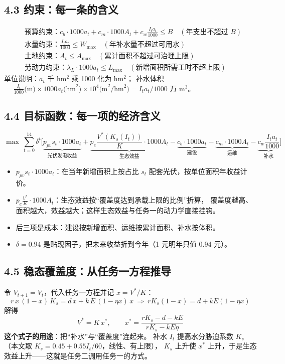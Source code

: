 \documentclass[11pt,a4paper]{ctexart}
\begin{document}
\subsection*{4.3 约束：每一条的含义}
\begin{align}
&\text{预算约束：} c_b\cdot1000a_t+c_m\cdot1000A_t+c_w\frac{I_ta_t}{1000}\le B \quad(\text{年支出不超过 }B)\\
&\text{水量约束：} \frac{I_ta_t}{1000}\le W_{\max} \quad(\text{年补水量不超过可用水})\\
&\text{土地约束：} A_t\le A_{\max} \quad(\text{累计面积不超过可治理上限})\\
&\text{劳动力约束：} \lambda_L\cdot1000a_t\le L_{\max} \quad(\text{新增面积所需工时不超上限})
\end{align}
单位说明：$a_t$ 千 hm$^2$ 乘 1000 化为 hm$^2$；
补水体积 $=\frac{I_t}{1000}\text{(m)}\times1000a_t\text{(hm}^2)\times10^4\text{(m}^2/\text{hm}^2)=I_ta_t/1000$ 万 m$^3$。

\subsection*{4.4 目标函数：每一项的经济含义}
\begin{equation}
\max\ \sum_{t=0}^{14}\delta^{t}\Big[\underbrace{p_{pv}s_t\cdot1000a_t}_{\text{光伏发电收益}}
+\underbrace{p_e\frac{V^*(K_s(I_t))}{K}\cdot1000A_t}_{\text{生态效益}}
-\underbrace{c_b\cdot1000a_t}_{\text{建设}}
-\underbrace{c_m\cdot1000A_t}_{\text{运维}}
-\underbrace{c_w\frac{I_ta_t}{1000}}_{\text{补水}}\Big]
\end{equation}
\begin{itemize}
\item $p_{pv}s_t\cdot1000a_t$：在当年新增面积上按占比 $s_t$ 配套光伏，按单位面积年收益计价。
\item $p_e\frac{V^*}{K}\cdot1000A_t$：生态效益按“覆盖度达到承载上限的比例”折算，
覆盖度越高、面积越大，效益越大；这样生态效益与任务一的动力学直接挂钩。
\item 后三项是成本：建设按新增面积、运维按累计面积、补水按体积。
\item $\delta=0.94$ 是贴现因子，把未来收益折到今年（1 元明年只值 0.94 元）。
\end{itemize}

\subsection*{4.5 稳态覆盖度：从任务一方程推导}
令 $V_{t+1}=V_t$，代入任务一方程并记 $x=V^*/K$：
\begin{equation}
r\,x\,(1-x)\,K_s=d\,x+k\,E\,(1-\eta x)\,x
\ \Longrightarrow\
rK_s(1-x)=d+kE(1-\eta x)
\end{equation}
解得
\begin{equation}
V^*=K\,x^*,\qquad
x^*=\frac{rK_s-d-kE}{rK_s-kE\eta}
\end{equation}
\textbf{这个式子的用途}：把“补水”与“覆盖度”连起来。
补水 $I_t$ 提高水分胁迫系数 $K_s$（本文取 $K_s=0.45+0.55I_t/60$，线性、有上限），
$K_s$ 上升使 $x^*$ 上升，于是生态效益上升——这就是任务二调用任务一的方式。
\end{document}
